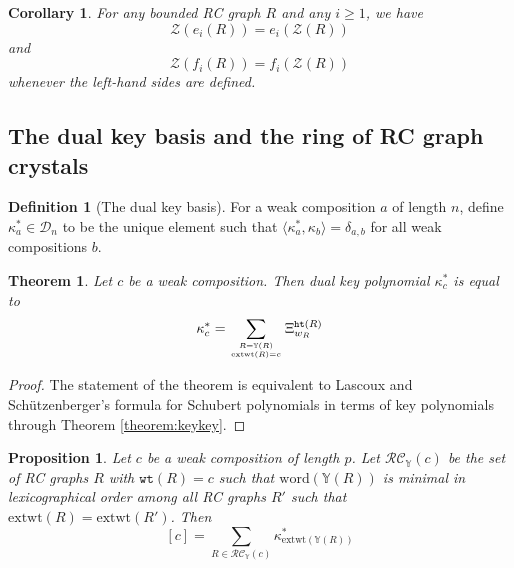 \documentclass{amsart}
\newtheorem{corollary}[lemma]{Corollary}
\newtheorem{proposition}[lemma]{Proposition}
\newtheorem{theorem}{Theorem}[section]
\theoremstyle{definition}
\newtheorem{definition}[lemma]{Definition}
\theoremstyle{remark}
\numberwithin{equation}{subsection}
\newcommand{\wof}[1]{w_{#1}}
\newcommand{\wtt}{\mathtt{wt}}
\newcommand{\zeromap}{\mathcal{Z}}
\newcommand{\hr}{\mathtt{ht}}
\newcommand{\RC}{\mathcal{RC}}
\newcommand{\dsch}{\ensuremath{\Xi}}
\newcommand{\dcoma}{\mathcal{D}}
\begin{document}
\begin{corollary} \label{corollary:crystaliso}
For any bounded RC graph $R$ and any $i\geq 1$, we have 
$$\zeromap(e_i(R)) = e_i(\zeromap(R))$$
and
$$\zeromap(f_i(R)) = f_i(\zeromap(R))$$
whenever the left-hand sides are defined.
\end{corollary}

\subsection{The dual key basis and the ring of RC graph crystals}

\begin{definition}[The dual key basis]
  For a weak composition $a$ of length $n$, define $\kappa_a^*\in \dcoma_n$ to be the unique element such that $\langle \kappa_a^*, \kappa_b\rangle = \delta_{a,b}$ for all weak compositions $b$.
\end{definition}






\begin{theorem} \label{theorem:keyformula}
  Let $c$ be a weak composition. Then dual key polynomial $\kappa^*_c$ is equal to
$$\kappa^*_c = \sum_{R=\mathbb{Y}(R)\atop\mathrm{extwt}(R)=c} \dsch_{\wof{R}}^{\hr(R)}$$
\end{theorem}
\begin{proof}
  The statement of the theorem is equivalent to Lascoux and Sch\"utzenberger's formula for Schubert polynomials in terms of key polynomials through Theorem \ref{theorem:keykey}.
\end{proof}

\begin{proposition}
Let $c$ be a weak composition of length $p$. Let $\RC_{\mathbb{Y}}(c)$ be the set of RC graphs $R$ with $\wtt(R) = c$ such that $\mathrm{word}(\mathbb{Y}(R))$ is minimal in lexicographical order among all RC graphs $R'$ such that $\mathrm{extwt}(R) = \mathrm{extwt}(R')$. Then
$$[c] = \sum_{R\in\RC_{\mathbb{Y}}(c)} \kappa_{\mathrm{extwt}(\mathbb{Y}(R))}^*$$
\end{proposition}
\end{document}
